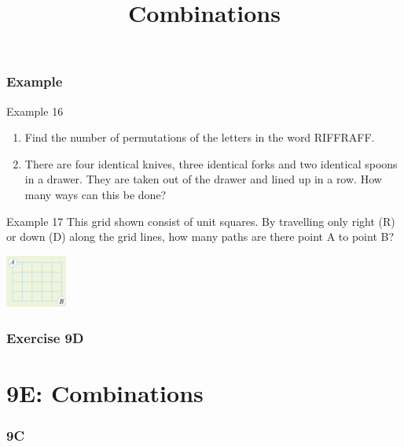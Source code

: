 \documentclass[
	11pt, %
]{beamer}
\begin{document}
\begin{frame}[t]
    \frametitle{Example}
    \begin{block}{Example 16}
        \begin{enumerate}
            \item Find the number of permutations of the letters in the word RIFFRAFF.
            \item There are four identical knives, three identical forks and two identical spoons in a drawer. 
            They are taken out of the drawer and lined up in a row. How many ways can this be done?
        \end{enumerate}
    \end{block}
    \begin{block}{Example 17}
        This grid shown consist of unit squares. By travelling only right (R) or down (D) along the grid lines, how many paths 
        are there point A to point B?
        \begin{center}
            \includegraphics[width=2cm]{Example17.png}
        \end{center}
    \end{block}
\end{frame}

\begin{frame}
    \frametitle{Exercise 9D}
\end{frame}


\section{9E: Combinations}
\begin{frame}
    \frametitle{9C}
    \begin{center}
        \title{Combinations}
        \maketitle
    \end{center}
\end{frame}
\end{document}
